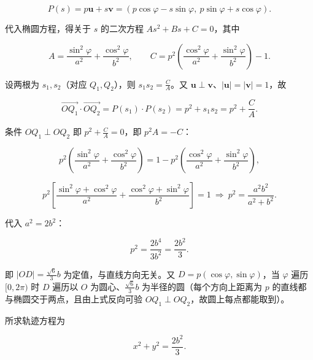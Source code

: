 \begin{answer}
\nopagebreak[4]
\[P(s)=p\boldsymbol u+s\boldsymbol v=\left(p\cos\varphi-s\sin\varphi,\ p\sin\varphi+s\cos\varphi\right).\]

代入椭圆方程，得关于 $s$ 的二次方程 $As^2+Bs+C=0$，其中

\nopagebreak[4]
\[A=\frac{\sin^2\varphi}{a^2}+\frac{\cos^2\varphi}{b^2},\qquad C=p^2\left(\frac{\cos^2\varphi}{a^2}+\frac{\sin^2\varphi}{b^2}\right)-1 .\]

设两根为 $s_1,s_2$（对应 $Q_1,Q_2$），则 $s_1s_2=\frac CA$。又 $\boldsymbol u\perp\boldsymbol v$、$|\boldsymbol u|=|\boldsymbol v|=1$，故

\nopagebreak[4]
\[\overrightarrow{OQ_1}\cdot\overrightarrow{OQ_2}=P(s_1)\cdot P(s_2)=p^2+s_1s_2=p^2+\frac CA .\]

条件 $OQ_1\perp OQ_2$ 即 $p^2+\frac CA=0$，即 $p^2A=-C$：

\nopagebreak[4]
\[p^2\left(\frac{\sin^2\varphi}{a^2}+\frac{\cos^2\varphi}{b^2}\right)=1-p^2\left(\frac{\cos^2\varphi}{a^2}+\frac{\sin^2\varphi}{b^2}\right),\]

\nopagebreak[4]
\[p^2\left[\frac{\sin^2\varphi+\cos^2\varphi}{a^2}+\frac{\cos^2\varphi+\sin^2\varphi}{b^2}\right]=1\ \Longrightarrow\ p^2=\frac{a^2b^2}{a^2+b^2}.\]

代入 $a^2=2b^2$：

\nopagebreak[4]
\[p^2=\frac{2b^4}{3b^2}=\frac{2b^2}3 .\]

即 $|OD|=\frac{\sqrt6}3b$ 为定值，与直线方向无关。又 $D=p\left(\cos\varphi,\sin\varphi\right)$，当 $\varphi$ 遍历 $[0,2\pi)$ 时 $D$ 遍历以 $O$ 为圆心、$\frac{\sqrt6}3b$ 为半径的圆（每个方向上距离为 $p$ 的直线都与椭圆交于两点，且由上式反向可验 $OQ_1\perp OQ_2$，故圆上每点都能取到）。

所求轨迹方程为

\nopagebreak[4]
\[x^2+y^2=\frac{2b^2}3 .\]


\end{answer}